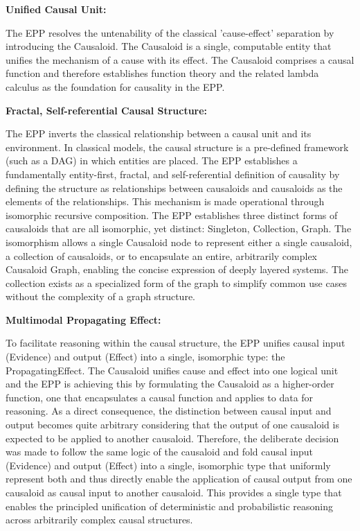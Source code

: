  \textbf{Unified Causal Unit:} 
 
 The EPP resolves the untenability of the classical 'cause-effect' separation by introducing the Causaloid. The Causaloid is a single, computable entity that unifies the mechanism of a cause with its effect. The Causaloid comprises a causal function and therefore establishes function theory and the related lambda calculus as the foundation for causality in the EPP. 

\textbf{Fractal, Self-referential Causal Structure:} 

The EPP inverts the classical relationship between a causal unit and its environment. In classical models, the causal structure is a pre-defined framework (such as a DAG) in which entities are placed. The EPP establishes a fundamentally entity-first, fractal, and self-referential definition of causality by defining the structure as relationships between causaloids and causaloids as the elements of the relationships. This mechanism is made operational through isomorphic recursive composition. The EPP establishes three distinct forms of causaloids that are all isomorphic, yet distinct: Singleton, Collection, Graph.  The isomorphism allows a single Causaloid node to represent either a single causaloid, a collection of causaloids, or to encapsulate an entire, arbitrarily complex Causaloid Graph, enabling the concise expression of deeply layered systems. The collection exists as a specialized form of the graph to simplify common use cases without the complexity of a graph structure. 


\textbf{Multimodal Propagating Effect:}
  
To facilitate reasoning within the causal structure, the EPP unifies causal input (Evidence) and output (Effect) into a single, isomorphic type: the PropagatingEffect. The Causaloid unifies cause and effect into one logical unit and the EPP is achieving this by formulating the Causaloid as a higher-order function, one that encapsulates a causal function and applies to data for reasoning. As a direct consequence, the distinction between causal input and output becomes quite arbitrary considering that the output of one causaloid is expected to be applied to another causaloid. Therefore, the deliberate decision was made to follow the same logic of the causaloid and fold causal input (Evidence) and output (Effect) into a single, isomorphic type that uniformly represent both and thus directly enable the application of causal output from one causaloid as causal input to another causaloid. This provides a single type that enables the principled unification of deterministic and probabilistic reasoning across arbitrarily complex causal structures. 
 

